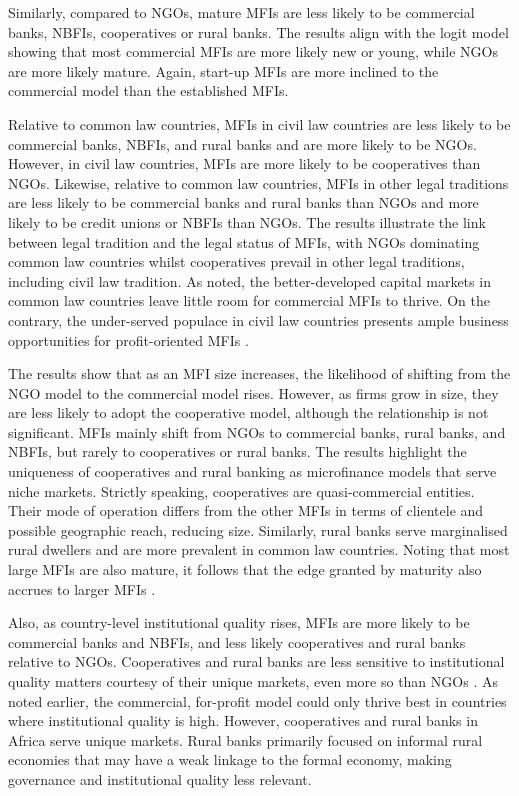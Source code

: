 \documentclass[a4paper,nobind]{templates/ociamthesis}
\begin{document}
Similarly, compared to NGOs, mature MFIs are less likely to be commercial banks, NBFIs, cooperatives or rural banks. The results align with the logit model showing that most commercial MFIs are more likely new or young, while NGOs are more likely mature. Again, start-up MFIs are more inclined to the commercial model than the established MFIs.

Relative to common law countries, MFIs in civil law countries are less likely to be commercial banks, NBFIs, and rural banks and are more likely to be NGOs. However, in civil law countries, MFIs are more likely to be cooperatives than NGOs. Likewise, relative to common law countries, MFIs in other legal traditions are less likely to be commercial banks and rural banks than NGOs and more likely to be credit unions or NBFIs than NGOs. The results illustrate the link between legal tradition and the legal status of MFIs, with NGOs dominating common law countries whilst cooperatives prevail in other legal traditions, including civil law tradition. As noted, the better-developed capital markets in common law countries leave little room for commercial MFIs to thrive. On the contrary, the under-served populace in civil law countries presents ample business opportunities for profit-oriented MFIs \autocite{d2013unsubsidized,mia2017mission}.

The results show that as an MFI size increases, the likelihood of shifting from the NGO model to the commercial model rises. However, as firms grow in size, they are less likely to adopt the cooperative model, although the relationship is not significant. MFIs mainly shift from NGOs to commercial banks, rural banks, and NBFIs, but rarely to cooperatives or rural banks. The results highlight the uniqueness of cooperatives and rural banking as microfinance models that serve niche markets. Strictly speaking, cooperatives are quasi-commercial entities. Their mode of operation differs from the other MFIs in terms of clientele and possible geographic reach, reducing size. Similarly, rural banks serve marginalised rural dwellers and are more prevalent in common law countries. Noting that most large MFIs are also mature, it follows that the edge granted by maturity also accrues to larger MFIs \autocite{beck2014sme,kersten2017small}.

Also, as country-level institutional quality rises, MFIs are more likely to be commercial banks and NBFIs, and less likely cooperatives and rural banks relative to NGOs. Cooperatives and rural banks are less sensitive to institutional quality matters courtesy of their unique markets, even more so than NGOs \autocite{sobel2008testing}. As noted earlier, the commercial, for-profit model could only thrive best in countries where institutional quality is high. However, cooperatives and rural banks in Africa serve unique markets. Rural banks primarily focused on informal rural economies that may have a weak linkage to the formal economy, making governance and institutional quality less relevant.
\end{document}
